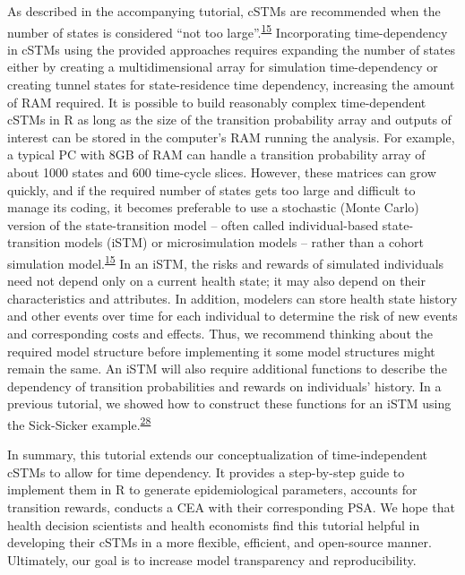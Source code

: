 \documentclass[
]{article}
\begin{document}
As described in the accompanying tutorial, cSTMs are recommended when the number of states is considered ``not too large''.\textsuperscript{\protect\hyperlink{ref-Siebert2012c}{15}} Incorporating time-dependency in cSTMs using the provided approaches requires expanding the number of states either by creating a multidimensional array for simulation time-dependency or creating tunnel states for state-residence time dependency, increasing the amount of RAM required. It is possible to build reasonably complex time-dependent cSTMs in R as long as the size of the transition probability array and outputs of interest can be stored in the computer's RAM running the analysis. For example, a typical PC with 8GB of RAM can handle a transition probability array of about 1000 states and 600 time-cycle slices. However, these matrices can grow quickly, and if the required number of states gets too large and difficult to manage its coding, it becomes preferable to use a stochastic (Monte Carlo) version of the state-transition model -- often called individual-based state-transition models (iSTM) or microsimulation models -- rather than a cohort simulation model.\textsuperscript{\protect\hyperlink{ref-Siebert2012c}{15}} In an iSTM, the risks and rewards of simulated individuals need not depend only on a current health state; it may also depend on their characteristics and attributes. In addition, modelers can store health state history and other events over time for each individual to determine the risk of new events and corresponding costs and effects. Thus, we recommend thinking about the required model structure before implementing it some model structures might remain the same. An iSTM will also require additional functions to describe the dependency of transition probabilities and rewards on individuals' history. In a previous tutorial, we showed how to construct these functions for an iSTM using the Sick-Sicker example.\textsuperscript{\protect\hyperlink{ref-Krijkamp2018}{28}}

In summary, this tutorial extends our conceptualization of time-independent cSTMs to allow for time dependency. It provides a step-by-step guide to implement them in R to generate epidemiological parameters, accounts for transition rewards, conducts a CEA with their corresponding PSA. We hope that health decision scientists and health economists find this tutorial helpful in developing their cSTMs in a more flexible, efficient, and open-source manner. Ultimately, our goal is to increase model transparency and reproducibility.
\end{document}
